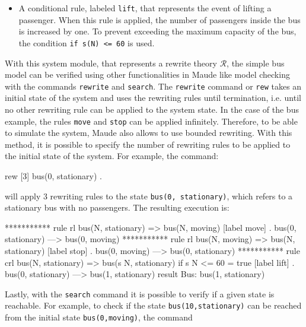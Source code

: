\begin{example}
\begin{itemize}
    \item A conditional rule, labeled \texttt{lift}, that represents the event of lifting a passenger. When this rule is applied, the number of passengers inside the bus is increased by one. To prevent exceeding the maximum capacity of the bus, the condition \texttt{if s(N) <= 60} is used. 
\end{itemize}
With this system module, that represents a rewrite theory $\mathscr{R}$, the simple bus model can be verified using other functionalities in Maude like model checking with the commands \texttt{rewrite} and \texttt{search}. The \texttt{rewrite} command or \texttt{rew} takes an initial state of the system and uses the rewriting rules until termination, i.e. until no other rewriting rule can be applied to the system state. In the case of the bus example, the rules \texttt{move} and \texttt{stop} can be applied infinitely. Therefore, to be able to simulate the system, Maude also allows to use bounded rewriting. With this method, it is possible to specify the number of rewriting rules to be applied to the initial state of the system. For example, the command: 
\begin{maude}

rew [3] bus(0, stationary) .
\end{maude}
will apply 3 rewriting rules to the state \texttt{bus(0, stationary)}, which refers to a stationary bus with no passengers. The resulting execution is:
\\
\begin{maude2}
*********** rule
rl bus(N, stationary) => bus(N, moving) [label move] .
bus(0, stationary)
--->
bus(0, moving)
*********** rule
rl bus(N, moving) => bus(N, stationary) [label stop] .
bus(0, moving)
--->
bus(0, stationary)
*********** rule
crl bus(N, stationary) => bus(s N, stationary) 
                          if s N <= 60 = true [label lift] .
bus(0, stationary)
--->
bus(1, stationary)
result Bus: bus(1, stationary)
\end{maude2}
Lastly, with the \texttt{search} command it is possible to verify if a given state is reachable. For example, to check if the state \texttt{bus(10,stationary)} can be reached from the initial state \texttt{bus(0,moving)}, the command 
\begin{maude}


\end{maude}
\end{example}

